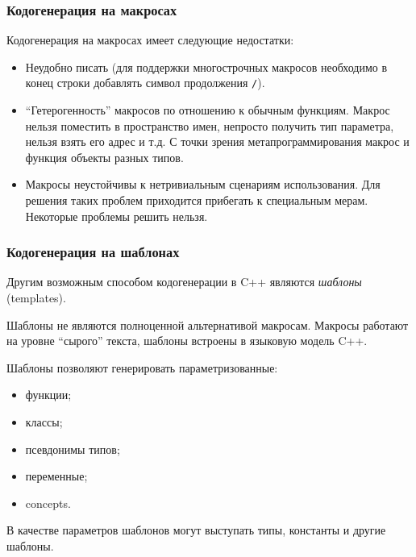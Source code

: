 \documentclass[compress, 8pt, aspectratio=169]{beamer}
\begin{document}
  \begin{frame}[fragile]

    \frametitle{Кодогенерация на макросах}

    Кодогенерация на макросах имеет следующие недостатки:

    \begin{itemize}
      \item Неудобно писать (для поддержки многострочных макросов
        необходимо в конец строки добавлять символ продолжения
        \verb|/|).
      \item \enquote{Гетерогенность} макросов по отношению
        к обычным функциям.
        Макрос нельзя поместить в пространство имен,
        непросто получить тип параметра,
        нельзя взять его адрес и т.д.
        С точки зрения метапрограммирования макрос и функция
        \textemdash \space объекты разных типов.
      \item Макросы неустойчивы к нетривиальным сценариям
        использования.
        Для решения таких проблем приходится прибегать к
        специальным мерам.
        Некоторые проблемы решить нельзя.
    \end{itemize}

  \end{frame}

  \begin{frame}[fragile]

    \frametitle{Кодогенерация на шаблонах}

    Другим возможным способом кодогенерации в C++ являются
    \textit{шаблоны}\footnotemark{} (templates).


    \hfill \break
    Шаблоны не являются полноценной альтернативой макросам.
    Макросы работают на уровне \enquote{сырого} текста, шаблоны
    \textemdash \space встроены в языковую модель C++.

    \hfill \break
    Шаблоны позволяют генерировать параметризованные:
    \begin{itemize}
      \item функции;
      \item классы;
      \item псевдонимы типов;
      \item переменные;
      \item concepts.
    \end{itemize}

    \hfill \break
    В качестве параметров шаблонов могут выступать типы, константы и
    другие шаблоны.

  \end{frame}
\end{document}
